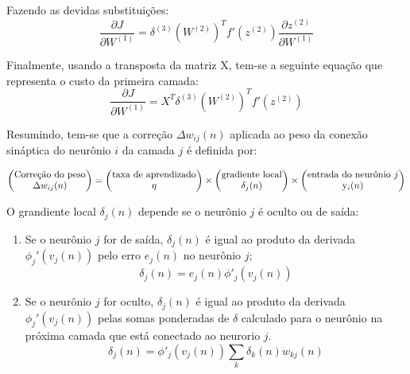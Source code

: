 Fazendo as devidas substituições:
\begin{equation}
    \frac{\partial J}{\partial W^{(1)}} = \delta^{(3)} (W^{(2)})^T f'(z^{(2)}) \frac{\partial z^{(2)}}{\partial W^{(1)}}
\end{equation}

Finalmente, usando a transposta da matriz X, tem-se a seguinte equação que representa o custo da primeira camada:
\begin{equation}
    \frac{\partial J}{\partial W^{(1)}} = X^T \delta^{(3)} (W^{(2)})^T f'(z^{(2)})
\end{equation}

Resumindo, tem-se que a correção $\Delta w_{ij}(n)$ aplicada ao peso da conexão sináptica do neurônio $i$ da camada $j$ é definida por:

\begin{equation*}
    \begin{pmatrix} 
    \text{Correção do peso} \\
    \Delta w_{ij}(n)
    \end{pmatrix}
    =
    \begin{pmatrix} 
    \text{taxa de aprendizado} \\ 
    \eta
    \end{pmatrix}
    \times
    \begin{pmatrix} 
    \text{gradiente local} \\ 
    \delta_j(n)
    \end{pmatrix}
    \times
    \begin{pmatrix} 
    \text{entrada do neurônio $j$} \\ 
    $y$_i(n)
    \end{pmatrix}
\end{equation*}

O grandiente local $\delta_j(n)$ depende se o neurônio $j$ é oculto ou de saída:
\begin{enumerate}
    \item Se o neurônio $j$ for de saída, $\delta_j(n)$ é igual ao produto da derivada $\phi_j'(v_j(n))$ pelo erro $e_j(n)$ no neurônio $j$;
    \begin{equation*}
        \delta_j(n) = e_j(n)\phi'_j(v_j(n))
    \end{equation*}
    \item Se o neurônio $j$ for oculto, $\delta_j(n)$ é igual ao produto da derivada $\phi_j'(v_j(n))$ pelas somas ponderadas de $\delta$ calculado para o neurônio na próxima camada que está conectado ao neurorio $j$.
    \begin{equation*}
        \delta_j(n) = \phi'_j(v_j(n)) \sum_k \delta_k(n)w_{kj}(n)
    \end{equation*}
\end{enumerate}

